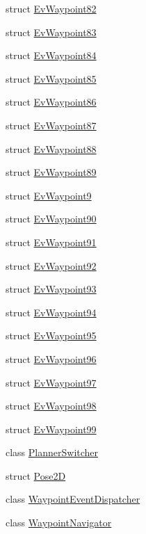 \begin{DoxyCompactItemize}
struct \hyperlink{structmove__base__z__client_1_1EvWaypoint82}{Ev\+Waypoint82}
\item 
struct \hyperlink{structmove__base__z__client_1_1EvWaypoint83}{Ev\+Waypoint83}
\item 
struct \hyperlink{structmove__base__z__client_1_1EvWaypoint84}{Ev\+Waypoint84}
\item 
struct \hyperlink{structmove__base__z__client_1_1EvWaypoint85}{Ev\+Waypoint85}
\item 
struct \hyperlink{structmove__base__z__client_1_1EvWaypoint86}{Ev\+Waypoint86}
\item 
struct \hyperlink{structmove__base__z__client_1_1EvWaypoint87}{Ev\+Waypoint87}
\item 
struct \hyperlink{structmove__base__z__client_1_1EvWaypoint88}{Ev\+Waypoint88}
\item 
struct \hyperlink{structmove__base__z__client_1_1EvWaypoint89}{Ev\+Waypoint89}
\item 
struct \hyperlink{structmove__base__z__client_1_1EvWaypoint9}{Ev\+Waypoint9}
\item 
struct \hyperlink{structmove__base__z__client_1_1EvWaypoint90}{Ev\+Waypoint90}
\item 
struct \hyperlink{structmove__base__z__client_1_1EvWaypoint91}{Ev\+Waypoint91}
\item 
struct \hyperlink{structmove__base__z__client_1_1EvWaypoint92}{Ev\+Waypoint92}
\item 
struct \hyperlink{structmove__base__z__client_1_1EvWaypoint93}{Ev\+Waypoint93}
\item 
struct \hyperlink{structmove__base__z__client_1_1EvWaypoint94}{Ev\+Waypoint94}
\item 
struct \hyperlink{structmove__base__z__client_1_1EvWaypoint95}{Ev\+Waypoint95}
\item 
struct \hyperlink{structmove__base__z__client_1_1EvWaypoint96}{Ev\+Waypoint96}
\item 
struct \hyperlink{structmove__base__z__client_1_1EvWaypoint97}{Ev\+Waypoint97}
\item 
struct \hyperlink{structmove__base__z__client_1_1EvWaypoint98}{Ev\+Waypoint98}
\item 
struct \hyperlink{structmove__base__z__client_1_1EvWaypoint99}{Ev\+Waypoint99}
\item 
class \hyperlink{classmove__base__z__client_1_1PlannerSwitcher}{Planner\+Switcher}
\item 
struct \hyperlink{structmove__base__z__client_1_1Pose2D}{Pose2D}
\item 
class \hyperlink{classmove__base__z__client_1_1WaypointEventDispatcher}{Waypoint\+Event\+Dispatcher}
\item 
class \hyperlink{classmove__base__z__client_1_1WaypointNavigator}{Waypoint\+Navigator}
\end{DoxyCompactItemize}
